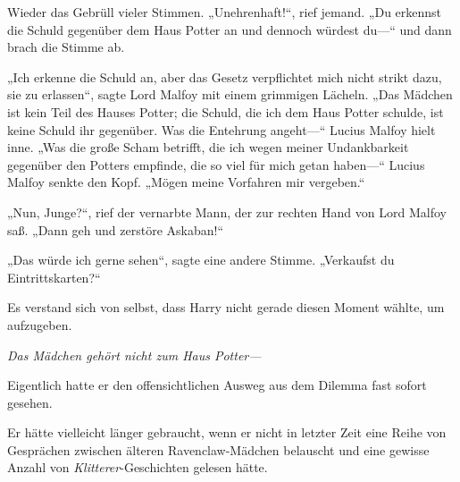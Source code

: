 Wieder das Gebrüll vieler Stimmen.
„Unehrenhaft!“, rief jemand.
„Du erkennst die Schuld gegenüber dem Haus Potter an und dennoch würdest du—“ und dann brach die Stimme ab.

„Ich erkenne die Schuld an, aber das Gesetz verpflichtet mich nicht strikt dazu, sie zu erlassen“, sagte Lord Malfoy mit einem grimmigen Lächeln. „Das Mädchen ist kein Teil des Hauses Potter; die Schuld, die ich dem Haus Potter schulde, ist keine Schuld ihr gegenüber. Was die Entehrung angeht—“ Lucius Malfoy hielt inne. „Was die große Scham betrifft, die ich wegen meiner Undankbarkeit gegenüber den Potters empfinde, die so viel für mich getan haben—“
Lucius Malfoy senkte den Kopf.
„Mögen meine Vorfahren mir vergeben.“

„Nun, Junge?“, rief der vernarbte Mann, der zur rechten Hand von Lord Malfoy saß. „Dann geh und zerstöre Askaban!“

„Das würde ich gerne sehen“, sagte eine andere Stimme. „Verkaufst du Eintrittskarten?“

Es verstand sich von selbst, dass Harry nicht gerade diesen Moment wählte, um aufzugeben.

\emph{Das Mädchen gehört nicht zum Haus Potter—}

Eigentlich hatte er den offensichtlichen Ausweg aus dem Dilemma fast sofort gesehen.

Er hätte vielleicht länger gebraucht, wenn er nicht in letzter Zeit eine Reihe von Gesprächen zwischen älteren Ravenclaw-Mädchen belauscht und eine gewisse Anzahl von \emph{Klitterer}-Geschichten gelesen hätte.

